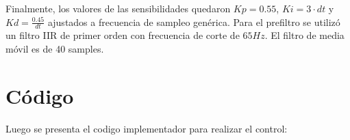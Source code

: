 Finalmente, los valores de las sensibilidades quedaron $Kp = 0.55$, $Ki = 3\cdot dt$ y $Kd = \frac{0.45}{dt}$ ajustados a frecuencia de sampleo genérica. Para el prefiltro se utilizó un filtro IIR de primer orden con frecuencia de corte de $65Hz$. El filtro de media móvil es de 40 samples.

\section{Código}
Luego se presenta el codigo implementador para realizar el control:
    

